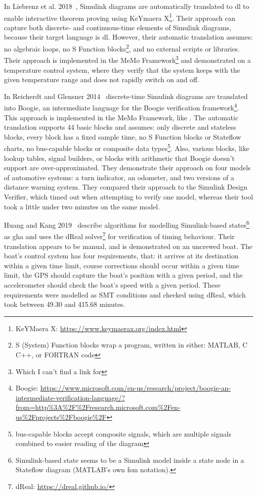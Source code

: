 In Liebrenz et al. 2018~\cite{liebrenz_deductive_2018}, Simulink diagrams are automatically translated to \gls{dl} to enable interactive theorem proving using KeYmaera X\footnote{KeYMaera X: \url{https://www.keymaerax.org/index.html} }. Their approach can capture both discrete- and continuous-time elements of Simulink diagrams, because their target language is \gls{dl}. However, their automatic translation assumes: no algebraic loops, no S Function blocks\footnote{S (System) Function blocks wrap a program, written in either: MATLAB, C C++, or FORTRAN code}, and no external scripts or libraries. Their approach is implemented in the MeMo Framework\footnote{Which I can't find a link for} and demonstrated on a temperature control system, where they verify that the system keeps with the given temperature range and does not rapidly switch on and off.

In Reicherdt and Glensner 2014~\cite{reicherdt_formal_2014} discrete-time Simulink diagrams are translated into Boogie, an intermediate language for the Boogie verification framework\footnote{Boogie: \url{https://www.microsoft.com/en-us/research/project/boogie-an-intermediate-verification-language/?from=http\%3A\%2F\%2Fresearch.microsoft.com\%2Fen-us\%2Fprojects\%2Fboogie\%2F}}. This approach is implemented in the MeMo Framework, like \cite{liebrenz_deductive_2018}. The automatic translation supports 44 basic blocks and assumes: only discrete and stateless blocks, every block has a fixed sample time, no S Function blocks or Stateflow charts, no bus-capable blocks or composite data types\footnote{bus-capable blocks accept composite signals, which are multiple signals combined to easier reading of the diagram}. Also, various blocks, like lookup tables, signal builders, or blocks with arithmetic that Boogie doesn't support are over-approximated. They demonstrate their approach on four models of automotive systems: a turn indicator, an odometer, and two versions of a distance warning system. They compared their approach to the Simulink Design Verifier, which timed out when attempting to verify one model, whereas their tool took a little under two minutes on the same model.

Huang and Kang 2019~\cite{huang_formal_2019} describe algorithms for modelling Simulink-based states\footnote{Simulink-based state seems to be a Simulink model inside a state node in a Stateflow diagram (MATLAB's own \gls{fsm} notation).} as \gls{gha} and uses the dReal solver\footnote{dReal: \url{https://dreal.github.io/}} for verification of timing behaviour. Their translation appears to be manual, and is demonstrated on an uncrewed boat. The boat's control system has four requirements, that: it arrives at its destination within a given time limit, course corrections should occur within a given time limit, the GPS should capture the boat's position with a given period, and the accelerometer should check the boat's speed with a given period. These requirements were modelled as SMT conditions and checked using dReal, which took between 49.30 and 415.68 minutes. 

